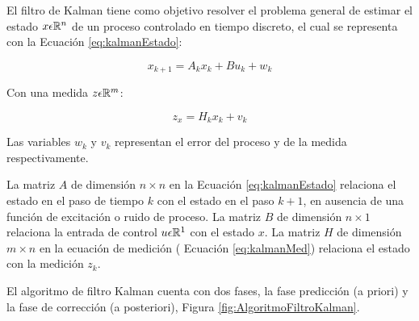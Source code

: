 El filtro de Kalman tiene como objetivo resolver el problema general de estimar el estado $x \space \epsilon \space \mathbb{R} ^{n}$ de un proceso controlado en tiempo discreto, el cual se representa con la Ecuación \ref{eq:kalmanEstado}:

\begin{equation}
\label{eq:kalmanEstado}
    x_{k+1} = A_kx_k + Bu_k + w_k
\end{equation}

Con una medida $z \space \epsilon \space \mathbb{R}^{m}$:

\begin{equation}
\label{eq:kalmanMed}
    z_x = H_kx_k + v_k
\end{equation}

Las variables $w_k$ y $v_k$ representan el error del proceso y de la medida respectivamente.

La matriz $A$  de dimensión $n\times{}n$ en la Ecuación \ref{eq:kalmanEstado} relaciona el estado en el paso de tiempo $k$ con el estado en el paso $k + 1$, en ausencia de una función de excitación o ruido de proceso. La matriz $B$ de dimensión $n\times{}1$ relaciona la entrada de control $u \space \epsilon \mathbb{R}^{1}$ con el estado $x$. La matriz $H$ de dimensión $m\times{}n$ en la ecuación de medición ( Ecuación \ref{eq:kalmanMed}) relaciona el estado con la medición $z_k$.

El algoritmo de filtro Kalman cuenta con dos fases, la fase predicción (a priori) y la fase de corrección (a posteriori), Figura \ref{fig:AlgoritmoFiltroKalman}.

